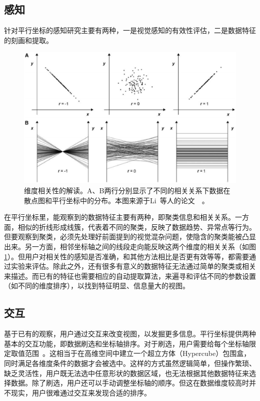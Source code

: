 \documentclass[12pt,twocolumn]{article}
\begin{document}
\subsection{感知}
\label{subsection:perceptionBasics}

针对平行坐标的感知研究主要有两种，一是视觉感知的有效性评估，二是数据特征的刻画和提取。

\begin{figure}[!htb]
\centering
\includegraphics[width=1.0\linewidth]{images/PC_correlation.eps}
\caption{\label{fig:PC_correlation}维度相关性的解读。A、B两行分别显示了不同的相关关系下数据在散点图和平行坐标中的分布。本图来源于Li~等人的论文~\citep{li2010judging}~。
}
\end{figure}

在平行坐标里，能观察到的数据特征主要有两种，即聚类信息和相关关系。一方面，相似的折线形成线簇，代表着不同的聚类，反映了数据趋势、异常点等行为。但要观察到聚类，必须先处理好前面提到的视觉混杂问题，使隐含的聚类能被凸显出来。另一方面，相邻坐标轴之间的线段走向能反映这两个维度的相关关系（如图\ref{fig:PC_correlation}）。但用户对相关性的感知是否准确，和其他方法相比是否更有效等等，都需要通过实验来评估。除此之外，还有很多有意义的数据特征无法通过简单的聚类或相关来描述。而已有的特征也需要相应的自动提取算法，来遍寻和评估不同的参数设置（如不同的维度排序），以找到特征明显、信息量大的视图。

\subsection{交互}

基于已有的观察，用户通过交互来改变视图，以发掘更多信息。平行坐标提供两种基本的交互功能，即数据刷选和坐标轴排序。对于刷选，用户需要给每个坐标轴限定取值范围~\citep{martin1995high}。这相当于在高维空间中建立一个超立方体（Hypercube）包围盒，同时满足各维度条件的数据才会被选中。这样的方式虽然逻辑简单，但操作繁琐、缺乏灵活性，用户既无法选中任意形状的数据区域，也无法根据其他数据特征来选择数据。除了刷选，用户还可以手动调整坐标轴的顺序。但这在数据维度较高时并不现实，用户很难通过交互来发现合适的排序。
\end{document}
